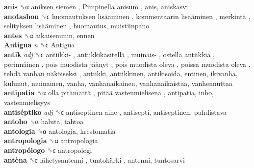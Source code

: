 \textbf{anis} ␝α   aniksen siemen ,  Pimpinella anisum , anis, aniskasvi  \\
\textbf{anotashon} ␝ϲ   huomautuksen lisääminen ,  kommentaarin lisääminen ,  merkintä ,  selityksen lisääminen , huomautus, muistiinpano  \\
\textbf{antes} ␝α  aikaisemmin, ennen  \\
\textbf{Antigua} \emph{n}  ␝ϲ   Antigua   \\
\textbf{antik} \emph{adj}  ␝ϲ   antiikki- ,  antiikkikäsitellä ,  muinais- ,  ostella antiikkia ,  perinnäinen ,  pois muodista jäänyt ,  pois muodista oleva ,  poissa muodista oleva ,  tehdä vanhan näköiseksi , antiikki, antiikkinen, antikisoida, entinen, ikivanha, kulunut, muinainen, vanha, vanhanaikainen, vanhanaikaistaa, vanhennuttaa  \\
\textbf{antipatia} ␝α   olla pitämättä ,  pitää vastenmielisenä , antipatia, inho, vastenmielisyys  \\
\textbf{antiséptiko} \emph{adj}  ␝ϲ   antiseptinen aine , antisepti, antiseptinen, puhdistava  \\
\textbf{antoho} ␝α  haluta, tahtoa  \\
\textbf{antologia} ␝α  antologia, krestomatia  \\
\textbf{antropologia} ␝α  antropologia  \\
\textbf{antropólogo} ␝ϲ  antropologi  \\
\textbf{antèna} ␝ϲ   lähetysantenni ,  tuntokärki , antenni, tuntosarvi  \\
